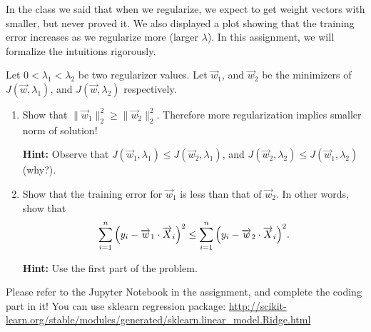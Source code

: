 \documentclass[11pt]{article}
\newenvironment{problem}[2][Problem]{\begin{trivlist}
\item[\hskip \labelsep {\bfseries #1}\hskip \labelsep {\bfseries #2.}]}{\end{trivlist}}
\begin{document}
\begin{problem}{3 (15 points) Regularization increases training error}
In the class we said that when we regularize, we expect to get weight vectors with smaller, but never proved it. We also displayed a plot showing that the training error increases as we regularize more (larger $\lambda$). In this assignment, we will formalize the intuitions rigorously.

Let $0<\lambda_1<\lambda_2$ be two regularizer values. Let $\overrightarrow w_1$, and $\overrightarrow w_2$ be the minimizers of $J(\overrightarrow w, \lambda_1)$, and $J(\overrightarrow w, \lambda_2)$ respectively. 

\begin{enumerate}
	\item Show that $\|\overrightarrow w_1\|_2^2\ge \|\overrightarrow w_2\|_2^2$. Therefore more regularization implies smaller norm of solution!
	
	\textbf{Hint:} Observe that $J(\overrightarrow w_1, \lambda_1)\le J(\overrightarrow w_2, \lambda_1)$, and $J(\overrightarrow w_2, \lambda_2)\le J(\overrightarrow w_1, \lambda_2)$ (why?). 
	\item Show that the training error for $\overrightarrow w_1$ is less than that of $\overrightarrow w_2$. In other words, show that 
\[
\sum_{i=1}^n {\left({y_i -\overrightarrow w_1\cdot \overrightarrow X_i}\right)}^2 \le \sum_{i=1}^n {\left({y_i -\overrightarrow w_2\cdot \overrightarrow X_i}\right)}^2.
\]

\textbf{Hint:} Use the first part of the problem.
\end{enumerate}

\end{problem}




\begin{problem}{4 (25 points) Linear and Quadratic Regression}
Please refer to the Jupyter Notebook in the assignment, and complete the coding part in it!
You can use sklearn regression package: \url{http://scikit-learn.org/stable/modules/generated/sklearn.linear_model.Ridge.html}
\end{problem}
\end{document}
